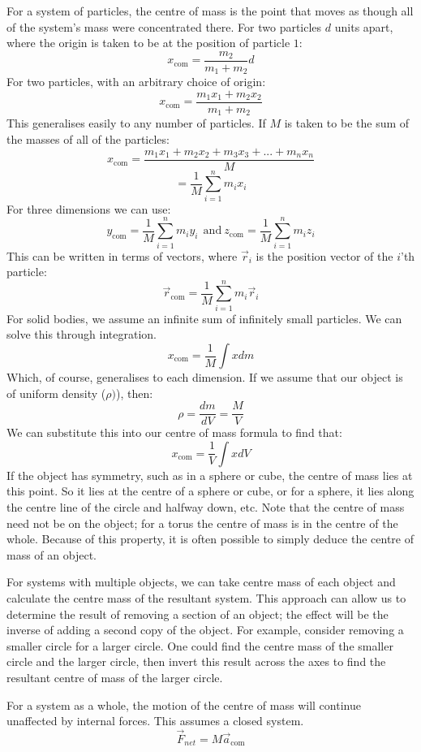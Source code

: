 \documentclass[12pt]{report}
\begin{document}
\bigskip
For a system of particles, the centre of mass is the point that moves as though all
of the system's mass were concentrated there. For two particles \(d\) units apart, where
the origin is taken to be at the position of particle \(1\):
\[x_\mathrm{com} = \frac{m_2}{m_1 + m_2}d\]
For two particles, with an arbitrary choice of origin:
\[x_\mathrm{com} = \frac{m_1x_1 + m_2x_2}{m_1 + m_2}\]
This generalises easily to any number of particles. If \(M\) is taken to be the sum
of the masses of all of the particles:
\[x_\mathrm{com} = \frac{m_1x_1 + m_2x_2 + m_3x_3 + ... + m_nx_n}{M}\]
\[= \frac{1}{M}\sum^n_{i = 1}m_ix_i\]
For three dimensions we can use:
\[y_\mathrm{com} = \frac{1}{M}\sum^n_{i = 1}m_iy_i\ \:\mathrm{and}\: z_\mathrm{com} = \frac{1}{M}\sum^n_{i = 1}m_iz_i\]
This can be written in terms of vectors, where \(\vec{r}_i\) is the position vector
of the \(i\)'th particle:
\[\vec{r}_\mathrm{com} = \frac{1}{M}\sum^n_{i = 1}m_i\vec{r}_i\]
For solid bodies, we assume an infinite sum of infinitely small particles. We can solve
this through integration.
\[x_\mathrm{com} = \frac{1}{M}\int x dm\]
Which, of course, generalises to each dimension. If we assume that our object is of uniform
density (\(\rho)\)), then:
\[\rho = \frac{dm}{dV} = \frac{M}{V}\]
We can substitute this into our centre of mass formula to find that:
\[x_\mathrm{com} = \frac{1}{V}\int x dV\]
If the object has symmetry, such as in a sphere or cube, the centre of mass
lies at this point. So it lies at the centre of a sphere or cube, or for a sphere,
it lies along the centre line of the circle and halfway down, etc. Note that the 
centre of mass need not be on the object; for a torus the centre of mass is in the
centre of the whole. Because of this property, it is often possible to simply 
deduce the centre of mass of an object.

\bigskip
For systems with multiple objects, we can take centre mass of each object and calculate
the centre mass of the resultant system. This approach can allow us to determine the result
of removing a section of an object; the effect will be the inverse of adding a second copy of 
the object. For example, consider removing a smaller circle for a larger circle. One could find
the centre mass of the smaller circle and the larger circle, then invert this result across
the axes to find the resultant centre of mass of the larger circle.

\bigskip
For a system as a whole, the motion of the centre of mass will continue unaffected by
internal forces. This assumes a closed system.
\[\vec{F}_{net} = M\vec{a}_\mathrm{com}\]
\end{document}
